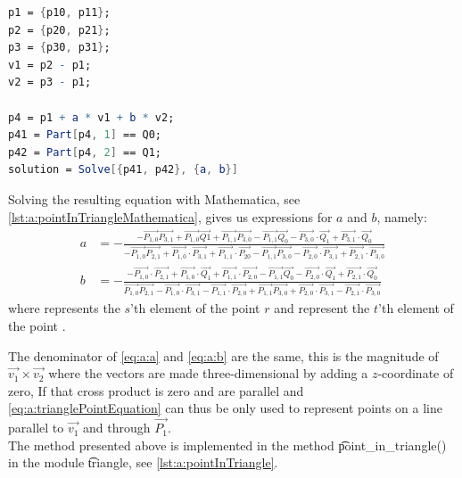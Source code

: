 	\begin{lstlisting}[float, language=Mathematica, label={lst:a:pointInTriangleMathematica}, caption={Mathematica code used to compute the to compute $a$ and $b$.}]
p1 = {p10, p11};
p2 = {p20, p21};
p3 = {p30, p31};
v1 = p2 - p1;
v2 = p3 - p1;

p4 = p1 + a * v1 + b * v2;
p41 = Part[p4, 1] == Q0;
p42 = Part[p4, 2] == Q1;
solution = Solve[{p41, p42}, {a, b}]\end{lstlisting}

Solving the resulting equation with Mathematica, see \autoref{lst:a:pointInTriangleMathematica}, gives us expressions for $a$ and $b$, namely:
	\begin{align}
	a &= -\frac{-\vec{P_{1,0}} \vec{P_{3,1}}+\vec{P_{1,0}} \vec{Q1}+\vec{P_{1,1}} \vec{P_{3,0}}-\vec{P_{1,1}}
   \vec{Q_0} - \vec{P_{3,0}} \cdot \vec{Q_1}+\vec{P_{3,1}} \cdot \vec{Q_0}}{ - \vec{P_{1,0}}
   \vec{P_{2,1}}+\vec{P_{1,0}} \cdot \vec{P_{3,1}}+\vec{P_{1,1}} \cdot \vec{P_{20}} - \vec{P_{1,1}}
   \vec{P_{3,0}} - \vec{P_{2,0}} \cdot \vec{P_{3,1}}+\vec{P_{2,1}} \cdot \vec{P_{3,0}}}\label{eq:a:a}\\
	b &=  - \frac{ - \vec{P_{1,0}} \cdot \vec{P_{2,1}}+\vec{P_{1,0}} \cdot \vec{Q_1}+\vec{P_{1,1}} \cdot \vec{P_{2,0}} - \vec{P_{1,1}}
   \vec{Q_0} - \vec{P_{2,0}} \cdot \vec{Q_1}+\vec{P_{2,1}} \cdot \vec{Q_0}}{\vec{P_{1,0}}
   \vec{P_{2,1}} - \vec{P_{1,0}} \cdot \vec{P_{3,1}} - \vec{P_{1,1}} \cdot \vec{P_{2,0}}+\vec{P_{1,1}}
   \vec{P_{3,0}}+\vec{P_{2,0}} \cdot \vec{P_{3,1}} - \vec{P_{2,1}} \cdot \vec{P_{3,0}}}\label{eq:a:b}
	\end{align}
where  represents the $s$'th element of the point $r$ and  represent the $t$'th element of the point .

The denominator of \eqref{eq:a:a} and \eqref{eq:a:b} are the same, this is the magnitude of $\vec{v_1} \times \vec{v_2}$ where the vectors are made three-dimensional by adding a $z$-coordinate of zero, If that cross product is zero  and  are parallel and \eqref{eq:a:trianglePointEquation} can thus be only used to represent points on a line parallel to $\vec{v_1}$ and through $\vec{P_1}$. \\

The method presented above is implemented in the method \t{point_in_triangle()} in the module \t{triangle}, see \autoref{lst:a:pointInTriangle}.



